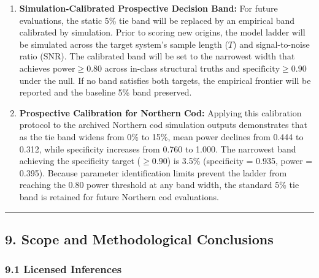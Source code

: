 \documentclass[11pt]{article}
\providecommand{\tightlist}{\setlength{\itemsep}{0.2em}\setlength{\parskip}{0pt}}
\begin{document}
\begin{enumerate}
\def\labelenumi{\arabic{enumi}.}
\setcounter{enumi}{2}
\tightlist
\item
  \textbf{Simulation-Calibrated Prospective Decision Band:} For future
  evaluations, the static 5\% tie band will be replaced by an empirical
  band calibrated by simulation. Prior to scoring new origins, the model
  ladder will be simulated across the target system's sample length
  (\(T\)) and signal-to-noise ratio (\(\text{SNR}\)). The calibrated
  band will be set to the narrowest width that achieves
  \(\text{power} \ge 0.80\) across in-class structural truths and
  \(\text{specificity} \ge 0.90\) under the null. If no band satisfies
  both targets, the empirical frontier will be reported and the baseline
  5\% band preserved.
\item
  \textbf{Prospective Calibration for Northern Cod:} Applying this
  calibration protocol to the archived Northern cod simulation outputs
  demonstrates that as the tie band widens from 0\% to 15\%, mean power
  declines from 0.444 to 0.312, while specificity increases from 0.760
  to 1.000. The narrowest band achieving the specificity target
  (\(\ge 0.90\)) is 3.5\% (specificity = 0.935, power = 0.395). Because
  parameter identification limits prevent the ladder from reaching the
  0.80 power threshold at any band width, the standard 5\% tie band is
  retained for future Northern cod evaluations.
\end{enumerate}

\begin{center}\rule{0.5\linewidth}{0.5pt}\end{center}

\subsection{9. Scope and Methodological
Conclusions}\label{scope-and-methodological-conclusions}

\subsubsection{9.1 Licensed Inferences}\label{licensed-inferences}
\end{document}
